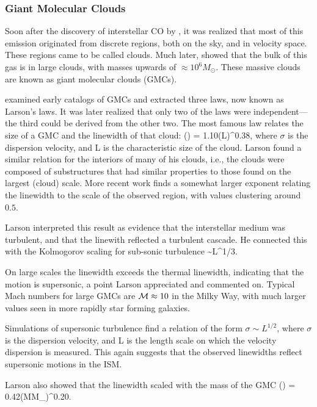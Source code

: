 \documentclass[../dissertation.tex]{subfiles}
\begin{document}
\subsubsection{Giant Molecular Clouds}
Soon after the discovery of interstellar CO by \citet{1970ApJ...161L..43W}, it was realized that most of this emission originated from discrete regions, both on the sky, and in velocity space. These regions came to be called clouds. Much later,
\citet{1987ApJ...319..730S}  showed that the bulk of this gas is in large clouds, with masses upwards of $\approx10^6M_\odot$. 
These massive clouds are known as giant molecular clouds (GMCs).

\citet{1981MNRAS.194..809L} examined early catalogs of GMCs and extracted three laws, now known as Larson's laws. It was later realized that only two of the laws were independent---the third could be derived from the other two. The most famous law relates the size of a GMC and the linewidth of that cloud:
%
\be
\left({\sigma\over \kms}\right) = 1.10\left({L\over \pc}\right)^{0.38}, 
\ee
%
where $\sigma$ is the dispersion velocity, and L is the characteristic size of the cloud.
Larson found a similar relation for the interiors of many of his clouds, i.e., the clouds were composed of substructures that had similar properties to those found on the largest (cloud) scale.
More recent work finds a somewhat larger exponent relating the linewidth to the scale of the observed region, with values clustering around $0.5$.

Larson interpreted this result as evidence that the interstellar medium was turbulent, and that the linewith reflected a turbulent cascade. 
He connected this with the Kolmogorov scaling for sub-sonic turbulence
%
\be
\sigma\sim L^{1/3}.
\ee
%

On large scales the linewidth exceeds the thermal linewidth, indicating that the motion is supersonic, a point Larson appreciated and commented on. Typical Mach numbers for large GMCs are ${\cal M}\approx 10$ in the Milky Way, with much larger values seen in more rapidly star forming galaxies.

Simulations of supersonic turbulence find a relation of the form $\sigma\sim L^{1/2}$,
where $\sigma$ is the dispersion velocity, and L is the length scale on which the velocity dispersion is measured. 
This again suggests that the observed linewidths reflect supersonic motions in the ISM.

Larson also showed that the linewidth scaled with the mass of the GMC
%
\be
\left({\sigma\over \kms}\right) = 0.42\left({M\over M_\odot}\right)^{0.20}.
\ee
%
\end{document}
